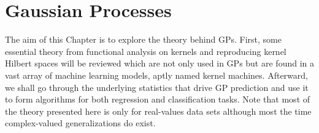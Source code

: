 \section{Gaussian Processes}\label{Chapter1}
The aim of this Chapter is to explore the theory behind GPs. First, some essential theory from functional analysis on kernels and reproducing kernel Hilbert spaces will be reviewed which are not only used in GPs but are found in a vast array of machine learning models, aptly named kernel machines. Afterward, we shall go through the underlying statistics that drive GP prediction and use it to form algorithms for both regression and classification tasks. Note that most of the theory presented here is only for real-values data sets although most the time complex-valued generalizations do exist.











